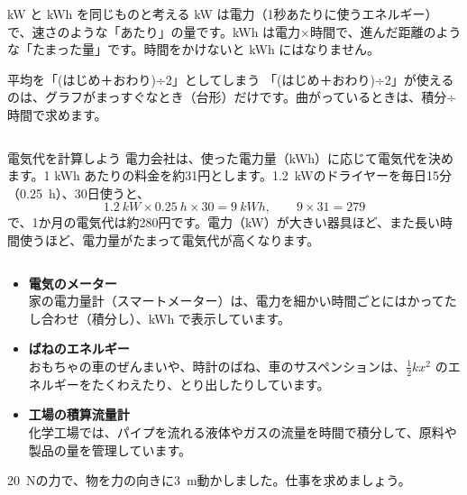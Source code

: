 \begin{tsumazuki}{kW と kWh を同じものと考える}
kW は電力（1秒あたりに使うエネルギー）で、速さのような「あたり」の量です。kWh は電力×時間で、進んだ距離のような「たまった量」です。時間をかけないと kWh にはなりません。
\end{tsumazuki}

\begin{tsumazuki}{平均を「(はじめ＋おわり)÷2」としてしまう}
「(はじめ＋おわり)÷2」が使えるのは、グラフがまっすぐなとき（台形）だけです。曲がっているときは、積分÷時間で求めます。
\end{tsumazuki}

\begin{column}{電気代を計算しよう}
電力会社は、使った電力量（kWh）に応じて電気代を決めます。1 kWh あたりの料金を約31円とします。\qty{1.2}{kW}のドライヤーを毎日15分（\qty{0.25}{h}）、30日使うと、
\[ \qty{1.2}{kW}\times\qty{0.25}{h}\times30=\qty{9}{kWh},\qquad 9\times31=279 \]
で、1か月の電気代は約280円です。電力（kW）が大きい器具ほど、また長い時間使うほど、電力量がたまって電気代が高くなります。
\end{column}

\begin{butsuri}
\begin{itemize}[leftmargin=1.2\zw, itemsep=1pt, topsep=0pt, label={\color{bkPurple}●}]
\item \textbf{電気のメーター}\\家の電力量計（スマートメーター）は、電力を細かい時間ごとにはかってたし合わせ（積分し）、kWh で表示しています。
\item \textbf{ばねのエネルギー}\\おもちゃの車のぜんまいや、時計のばね、車のサスペンションは、$\frac{1}{2}kx^2$ のエネルギーをたくわえたり、とり出したりしています。
\item \textbf{工場の積算流量計}\\化学工場では、パイプを流れる液体やガスの流量を時間で積分して、原料や製品の量を管理しています。
\end{itemize}
\end{butsuri}

\bkendproblems
{}

\bkproblem \qty{20}{N}の力で、物を力の向きに\qty{3}{m}動かしました。仕事を求めましょう。

